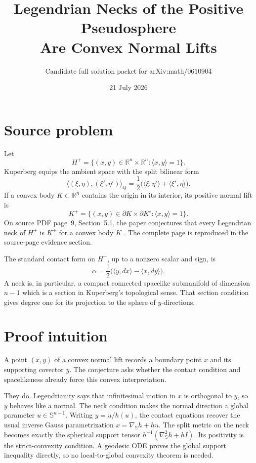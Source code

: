 \documentclass[11pt]{article}
\title{Legendrian Necks of the Positive Pseudosphere\\
Are Convex Normal Lifts}
\author{Candidate full solution packet for arXiv:math/0610904}
\date{21 July 2026}
\newcommand{\R}{\mathbb{R}}
\newcommand{\Sph}{\mathbb{S}}
\newcommand{\ip}[2]{\langle #1,#2\rangle}
\begin{document}
\maketitle

\begin{center}
\end{center}

\section{Source problem}

Let
\[
 H^+=\{(x,y)\in\R^n\times\R^n:\ip{x}{y}=1\}.
\]
Kuperberg equips the ambient space with the split bilinear form
\[
 \big\langle (\xi,\eta),(\xi',\eta')\big\rangle_Q
 =\frac12\big(\ip{\xi}{\eta'}+\ip{\xi'}{\eta}\big).
\]
If a convex body $K\subset\R^n$ contains the origin in its interior, its
positive normal lift is
\[
 K^+=\{(x,y)\in\partial K\times\partial K^\circ:\ip{x}{y}=1\}.
\]
On source PDF page~9, Section~5.1, the paper conjectures that every
Legendrian neck of $H^+$ is $K^+$ for a convex body $K$ \cite{Kuperberg}.
The complete page is reproduced in the source-page evidence section.

The standard contact form on $H^+$, up to a nonzero scalar and sign, is
\[
 \alpha=\frac12\big(\ip{y}{dx}-\ip{x}{dy}\big).
\]
A neck is, in particular, a compact connected spacelike submanifold of
dimension $n-1$ which is a section in Kuperberg's topological sense. That
section condition gives degree one for its projection to the sphere of
$y$-directions.

\section{Proof intuition}

A point $(x,y)$ of a convex normal lift records a boundary point $x$ and its
supporting covector $y$. The conjecture asks whether the contact condition and
spacelikeness already force this convex interpretation.

They do. Legendrianity says that infinitesimal motion in $x$ is orthogonal to
$y$, so $y$ behaves like a normal. The neck condition makes the normal
direction a global parameter $u\in\Sph^{n-1}$. Writing $y=u/h(u)$, the contact
equations recover the usual inverse Gauss parametrization
$x=\nabla_{\Sph}h+hu$. The split metric on the neck becomes exactly the
spherical support tensor $h^{-1}(\nabla_{\Sph}^2h+hI)$. Its positivity is the
strict-convexity condition. A geodesic ODE proves the global support inequality
directly, so no local-to-global convexity theorem is needed.
\end{document}
